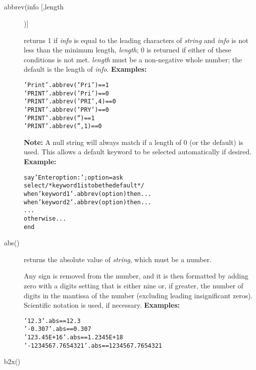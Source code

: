 \subsection{}\label{"id"}
\begin{description}
\item[abbrev(info [,length])]\label{refabbrev}

returns 1 if \emph{info} is equal to the leading characters of
\emph{string} and \emph{info} is not less than
the minimum length, \emph{length}; 0 is returned
if either of these conditions is not met.
\emph{length} must be a non-negative whole number; the default is
the length of \emph{info}.
 \textbf{Examples:}
\begin{alltt}
'Print'.abbrev('Pri')   == 1
'PRINT'.abbrev('Pri')   == 0
'PRINT'.abbrev('PRI',4) == 0
'PRINT'.abbrev('PRY')   == 0
'PRINT'.abbrev('')      == 1
'PRINT'.abbrev('',1)    == 0
\end{alltt}
\textbf{Note: }A null string will always match if a length of 0 (or the default)
is used.
This allows a default keyword to be selected automatically if desired.
 \textbf{Example:}
\begin{alltt}
say 'Enter option:';  option=ask
select  /* keyword1 is to be the default */
  when 'keyword1'.abbrev(option) then ...
  when 'keyword2'.abbrev(option) then ...
     ...
  otherwise ...
  end
\end{alltt}
\item[abs()]\label{refabs}

returns the absolute value of \emph{string}, which must be a
number.
 
Any sign is removed from the number, and it is then formatted by adding
zero with a digits setting that is either nine or, if greater, the
number of digits in the mantissa of the number (excluding leading
insignificant zeros).
Scientific notation is used, if necessary.
 \textbf{Examples:}
\begin{alltt}
'12.3'.abs              == 12.3
' -0.307'.abs           == 0.307
'123.45E+16'.abs        == 1.2345E+18
'- 1234567.7654321'.abs == 1234567.7654321
\end{alltt}
\item[b2x()]\label{refb2x}


\end{description}
